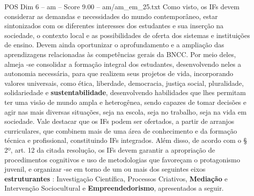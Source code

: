 \begin{textsample}{POS Dim 6 – am – Score 9.00 – am/am\_em\_25.txt}
Como visto, os IFs devem considerar as demandas e necessidades do mundo contemporâneo, estar sintonizados com os diferentes interesses dos estudantes e sua inserção na sociedade, o contexto local e as possibilidades de oferta dos sistemas e instituições de ensino.
Devem ainda oportunizar o aprofundamento e a ampliação das aprendizagens relacionadas às competências gerais da BNCC.
Por meio deles, almeja -se consolidar a formação integral dos estudantes, desenvolvendo neles a autonomia necessária, para que realizem seus projetos de vida, incorporando valores universais, como ética, liberdade, democracia, justiça social, pluralidade, solidariedade e \textbf{sustentabilidade}, desenvolvendo habilidades que lhes permitam ter uma visão de mundo ampla e heterogênea, sendo capazes de tomar decisões e agir nas mais diversas situações, seja na escola, seja no trabalho, seja na vida em sociedade.
Vale destacar que os IFs podem ser ofertados, a partir de arranjos curriculares, que combinem mais de uma área de conhecimento e da formação técnica e profissional, constituindo IFs integrados.
Além disso, de acordo com o § 2º, art. 12 da citada resolução, os IFs devem garantir a apropriação de procedimentos cognitivos e uso de metodologias que favoreçam o protagonismo juvenil, e organizar -se em torno de um ou mais dos seguintes eixos \textbf{estruturantes} : Investigação Científica, Processos Criativos, \textbf{Mediação} e Intervenção Sociocultural e \textbf{Empreendedorismo}, apresentados a seguir.

\end{textsample}
